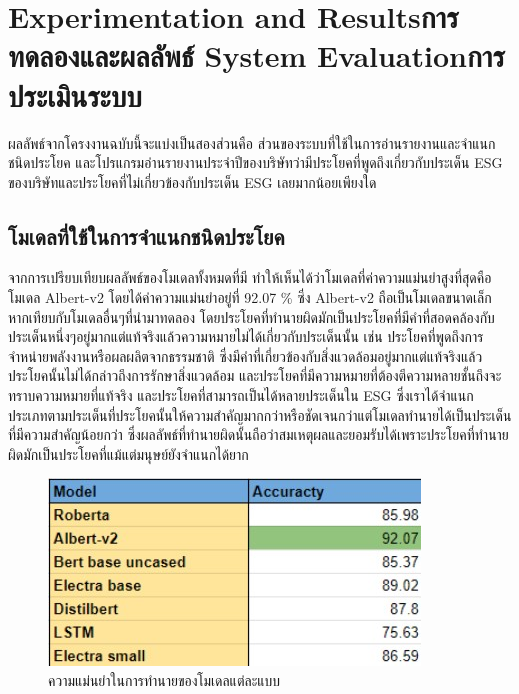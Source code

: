 \chapter{\ifproject%
\ifenglish Experimentation and Results\else การทดลองและผลลัพธ์\fi
\else%
\ifenglish System Evaluation\else การประเมินระบบ\fi
\fi}

\enskip \enskip \enskip ผลลัพธ์จากโครงงานฉบับนี้จะแบ่งเป็นสองส่วนคือ 
ส่วนของระบบที่ใช้ในการอ่านรายงานและจำแนกชนิดประโยค 
และโปรแกรมอ่านรายงานประจำปีของบริษัทว่ามีประโยคที่พูดถึงเกี่ยวกับประเด็น ESG ของบริษัทและประโยคที่ไม่เกี่ยวข้องกับประเด็น ESG เลยมากน้อยเพียงใด

\section{โมเดลที่ใช้ในการจำแนกชนิดประโยค}

\enskip \enskip \enskip จากการเปรียบเทียบผลลัพธ์ของโมเดลทั้งหมดที่มี 
ทำให้เห็นได้ว่าโมเดลที่ค่าความแม่นยำสูงที่สุดคือโมเดล Albert-v2
โดยได้ค่าความแม่นยำอยู่ที่ 92.07 \%
ซึ่ง Albert-v2 ถือเป็นโมเดลขนาดเล็กหากเทียบกับโมเดลอื่นๆที่นำมาทดลอง
โดยประโยคที่ทำนายผิดมักเป็นประโยคที่มีคำที่สอดคล้องกับประเด็นหนึ่งๆอยู่มากแต่แท้จริงแล้วความหมายไม่ได้เกี่ยวกับประเด็นนั้น
เช่น ประโยคที่พูดถึงการจำหน่ายพลังงานหรือผลผลิตจากธรรมชาติ
ซึ่งมีคำที่เกี่ยวข้องกับสิ่งแวดล้อมอยู่มากแต่แท้จริงแล้วประโยคนั้นไม่ได้กล่าวถึงการรักษาสิ่งแวดล้อม
และประโยคที่มีความหมายที่ต้องตีความหลายชั้นถึงจะทราบความหมายที่แท้จริง
และประโยคที่สามารถเป็นได้หลายประเด็นใน ESG 
ซึ่งเราได้จำแนกประเภทตามประเด็นที่ประโยคนั้นให้ความสำคัญมากกว่าหรือชัดเจนกว่าแต่โมเดลทำนายได้เป็นประเด็นที่มีความสำคัญน้อยกว่า
ซึ่งผลลัพธ์ที่ทำนายผิดนั้นถือว่าสมเหตุผลและยอมรับได้เพราะประโยคที่ทำนายผิดมักเป็นประโยคที่แม้แต่มนุษย์ยังจำแนกได้ยาก

\begin{figure}
\begin{center}
\includegraphics{accuracy.jpg}
\end{center}
\caption[ความแม่นยำในการทำนายของโมเดลแต่ละแบบ]{ความแม่นยำในการทำนายของโมเดลแต่ละแบบ}
\label{fig:ความแม่นยำในการทำนายของโมเดลแต่ละแบบ}
\end{figure}


